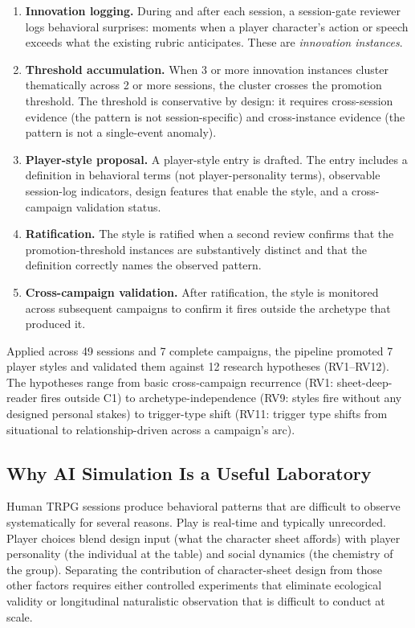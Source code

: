 \begin{enumerate}
  \item \textbf{Innovation logging.} During and after each session, a session-gate
    reviewer logs behavioral surprises: moments when a player character's action or
    speech exceeds what the existing rubric anticipates. These are \textit{innovation
    instances}.
  \item \textbf{Threshold accumulation.} When 3 or more innovation instances cluster
    thematically across 2 or more sessions, the cluster crosses the promotion threshold.
    The threshold is conservative by design: it requires cross-session evidence (the
    pattern is not session-specific) and cross-instance evidence (the pattern is not a
    single-event anomaly).
  \item \textbf{Player-style proposal.} A player-style entry is drafted. The entry
    includes a definition in behavioral terms (not player-personality terms), observable
    session-log indicators, design features that enable the style, and a cross-campaign
    validation status.
  \item \textbf{Ratification.} The style is ratified when a second review confirms that
    the promotion-threshold instances are substantively distinct and that the definition
    correctly names the observed pattern.
  \item \textbf{Cross-campaign validation.} After ratification, the style is monitored
    across subsequent campaigns to confirm it fires outside the archetype that produced
    it.
\end{enumerate}

Applied across 49 sessions and 7 complete campaigns, the pipeline promoted 7 player
styles and validated them against 12 research hypotheses (RV1--RV12). The hypotheses
range from basic cross-campaign recurrence (RV1: sheet-deep-reader fires outside C1)
to archetype-independence (RV9: styles fire without any designed personal stakes) to
trigger-type shift (RV11: trigger type shifts from situational to relationship-driven
across a campaign's arc).

\subsection{Why AI Simulation Is a Useful Laboratory}

Human TRPG sessions produce behavioral patterns that are difficult to observe
systematically for several reasons. Play is real-time and typically unrecorded.
Player choices blend design input (what the character sheet affords) with player
personality (the individual at the table) and social dynamics (the chemistry of the
group). Separating the contribution of character-sheet design from those other factors
requires either controlled experiments that eliminate ecological validity or longitudinal
naturalistic observation that is difficult to conduct at scale.

